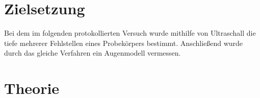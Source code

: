 \section{Zielsetzung}
Bei dem im folgenden protokollierten Versuch wurde mithilfe von Ultraschall die tiefe mehrerer Fehlstellen eines Probekörpers bestimmt. Anschließend wurde durch das gleiche Verfahren ein Augenmodell vermessen. 
\section{Theorie}
\label{sec:theorie}
